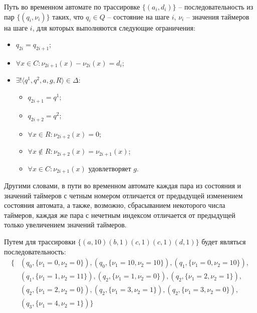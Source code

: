 \documentclass[times,specification,annotation]{itmo-student-thesis}
\begin{document}
\begin{definition}
  Путь во временном автомате по трассировке $\{\left( a_i, d_i \right)\}$ -- последовательность из пар $\{\left( q_i, \nu_i \right)\}$ таких, 
  что $q_i \in Q$ -- состояние на шаге $i$, $\nu_i$ -- значения таймеров на шаге $i$, для которых выполняются следующие ограничения:
  \begin{itemize}
    \item $q_{2i} = q_{2i+1}$;
    \item $\forall x \in C: \nu_{2i+1}(x) - \nu_{2i}(x) = d_i$;
    \item $\exists! \langle q^1, q^2, a, g, R \rangle \in \Delta$: 
      \begin{itemize}
	\item $q_{2i+1} = q^1$;
	\item $q_{2i+2} = q^2$;
        \item $\forall x \in R: \nu_{2i+2}(x) = 0$;
	\item $\forall x \not\in R: \nu_{2i+2}(x) = \nu_{2i+1}(x)$;
	\item $\forall x \in C: \nu_{2i+1}(x)$ удовлетворяет $g$.
      \end{itemize}
  \end{itemize}
\end{definition}

Другими словами, в пути во временном автомате каждая пара из состояния и значений таймеров с 
четным номером отличается от предыдущей изменением состояния автомата, а также, возможно, сбрасыванием некоторого числа таймеров, 
каждая же пара с нечетным индексом отличается от предыдущей только увеличением значений таймеров.

\begin{example}
  Путем для трассировки $\{ \left( a, 10 \right) \left( b, 1 \right) \left( c, 1 \right) \left( c, 1 \right) \left( d, 1 \right) \}$
  будет являться последовательность: 
  \begin{equation}
    \begin{split}
      \{ &\left( q_0, \{ \nu_1 = 0, \nu_2 = 0 \} \right), \left( q_0, \{ \nu_1 = 10, \nu_2 = 10 \} \right), \left( q_1, \{ \nu_1 = 0, \nu_2 = 10 \} \right), \\
	 &\left( q_1, \{ \nu_1 = 1, \nu_2 = 11 \} \right), \left( q_2, \{ \nu_1 = 1, \nu_2 = 0 \} \right), \left( q_2, \{ \nu_1 = 2, \nu_2 = 1 \} \right), \\
	 &\left( q_2, \{ \nu_1 = 2, \nu_2 = 0 \} \right), \left( q_2, \{ \nu_1 = 3, \nu_2 = 1 \}  \right), \left( q_2, \{ \nu_1 = 3, \nu_2 = 0 \} \right), \\
         &\left( q_3, \{ \nu_1 = 4, \nu_2 = 1 \} \right) \}
    \end{split}
  \end{equation}
\end{example}
\end{document}
